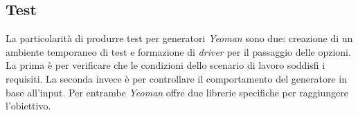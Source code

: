 \subsection{Test}
La particolarità di produrre test per generatori \textit{Yeoman} sono due:
creazione di un ambiente temporaneo di test e formazione di \textit{driver} per
il passaggio delle opzioni. La prima è per verificare che le condizioni dello
scenario di lavoro soddisfi i requisiti. La seconda invece è per controllare il
comportamento del generatore in base all'input. Per entrambe \textit{Yeoman}
offre due librerie specifiche per raggiungere l'obiettivo.
